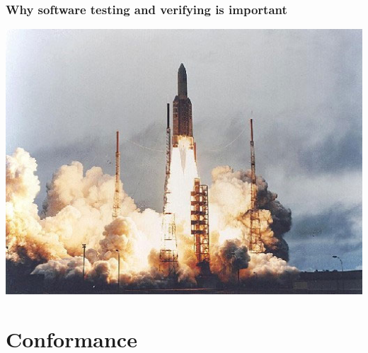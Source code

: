 \documentclass{beamer}
\begin{document}
\begin{frame}
\frametitle{Why software testing and verifying is important}
\begin{center}
\includegraphics[width=.88\textwidth]{../img/ariane}
\end{center}
\end{frame}

\section{Conformance} %
\end{document}
